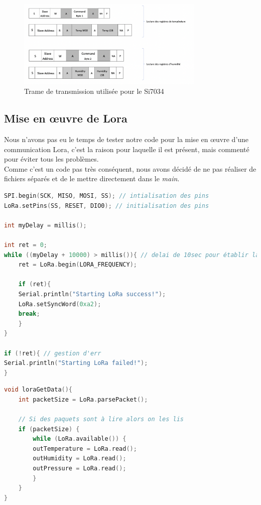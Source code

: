         \begin{figure}[!h]
            \begin{center}
                \includegraphics[width=0.8\textwidth]{img/code/trame_si.png}
                \caption{\label{fig:trame_si}Trame de transmission utilisée pour le Si7034}  
            \end{center}
        \end{figure}





        \subsection{Mise en œuvre de Lora}
            Nous n'avons pas eu le temps de tester notre code pour la mise en œuvre d'une communication Lora, c'est la raison pour laquelle il est présent, mais commenté pour éviter tous les problèmes. \\
            Comme c'est un code pas très conséquent, nous avons décidé de ne pas réaliser de fichiers séparés et de le mettre directement dans le \textit{main}.

\begin{lstlisting}[style=myC, caption=Initialisation de Lora pour la carte serveur, language=C, frame=lines]
SPI.begin(SCK, MISO, MOSI, SS); // intialisation des pins
LoRa.setPins(SS, RESET, DIO0); // initialisation des pins

int myDelay = millis();

int ret = 0;
while ((myDelay + 10000) > millis()){ // delai de 10sec pour établir la communication Lora
    ret = LoRa.begin(LORA_FREQUENCY);

    if (ret){
    Serial.println("Starting LoRa success!");
    LoRa.setSyncWord(0xa2);
    break;
    }
}

if (!ret){ // gestion d'err
Serial.println("Starting LoRa failed!");
}
\end{lstlisting}

\begin{lstlisting}[style=myC, caption=Réception de données, language=C, frame=lines]
void loraGetData(){
    int packetSize = LoRa.parsePacket();
    
    // Si des paquets sont à lire alors on les lis
    if (packetSize) {
        while (LoRa.available()) {
        outTemperature = LoRa.read();
        outHumidity = LoRa.read();
        outPressure = LoRa.read();
        }
    }
}
\end{lstlisting}


